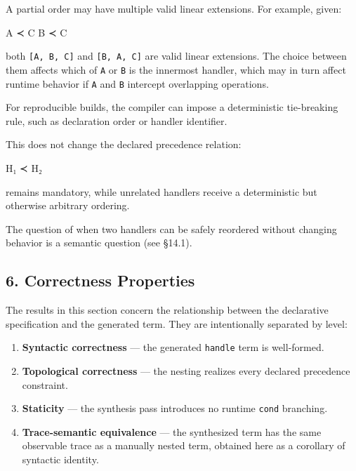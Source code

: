 \documentclass[
  11pt,
]{article}
\newenvironment{Shaded}{}{}
\newcommand{\NormalTok}[1]{#1}
\providecommand{\tightlist}{%
  \setlength{\itemsep}{0pt}\setlength{\parskip}{0pt}}
\begin{document}
A partial order may have multiple valid linear extensions. For example,
given:

\begin{Shaded}
\begin{Highlighting}[]
\NormalTok{A ≺ C}
\NormalTok{B ≺ C}
\end{Highlighting}
\end{Shaded}

both \texttt{{[}A,\ B,\ C{]}} and \texttt{{[}B,\ A,\ C{]}} are valid
linear extensions. The choice between them affects which of \texttt{A}
or \texttt{B} is the innermost handler, which may in turn affect runtime
behavior if \texttt{A} and \texttt{B} intercept overlapping operations.

For reproducible builds, the compiler can impose a deterministic
tie-breaking rule, such as declaration order or handler identifier.

This does not change the declared precedence relation:

\begin{Shaded}
\begin{Highlighting}[]
\NormalTok{H₁ ≺ H₂}
\end{Highlighting}
\end{Shaded}

remains mandatory, while unrelated handlers receive a deterministic but
otherwise arbitrary ordering.

The question of when two handlers can be safely reordered without
changing behavior is a semantic question (see §14.1).

\subsection{6. Correctness Properties}\label{correctness-properties}

The results in this section concern the relationship between the
declarative specification and the generated term. They are intentionally
separated by level:

\begin{enumerate}
\def\labelenumi{\arabic{enumi}.}
\tightlist
\item
  \textbf{Syntactic correctness} --- the generated \texttt{handle} term
  is well-formed.
\item
  \textbf{Topological correctness} --- the nesting realizes every
  declared precedence constraint.
\item
  \textbf{Staticity} --- the synthesis pass introduces no runtime
  \texttt{cond} branching.
\item
  \textbf{Trace-semantic equivalence} --- the synthesized term has the
  same observable trace as a manually nested term, obtained here as a
  corollary of syntactic identity.
\end{enumerate}
\end{document}
